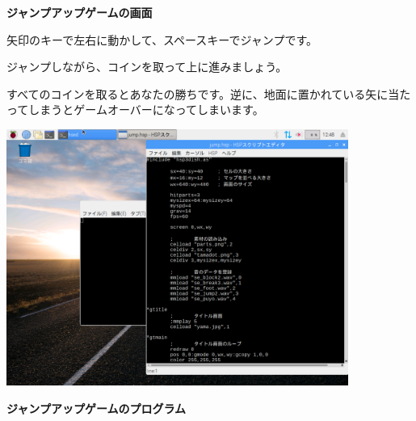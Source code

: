 \documentclass[a4paper,dvipdfmx]{jarticle}
\begin{document}
\bigskip

{\bfseries
ジャンプアップゲームの画面}


\bigskip


\bigskip


\bigskip

矢印のキーで左右に動かして、スペースキーでジャンプです。

ジャンプしながら、コインを取って上に進みましょう。

すべてのコインを取るとあなたの勝ちです。逆に、地面に置かれている矢に当たってしまうとゲームオーバーになってしまいます。


\bigskip



\begin{center}
\includegraphics[width=11.192cm,height=8.393cm]{text04-img/text04-img024.png}

\end{center}

\bigskip


\bigskip


\bigskip


\bigskip


\bigskip


\bigskip


\bigskip


\bigskip


\bigskip


\bigskip


\bigskip


\bigskip


\bigskip


\bigskip

{\bfseries
ジャンプアップゲームのプログラム}
\end{document}
